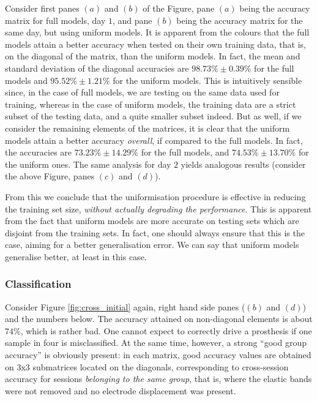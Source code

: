 Consider first panes $(a)$ and $(b)$ of the Figure, pane $(a)$ being
the accuracy matrix for full models, day $1$, and pane $(b)$ being the
accuracy matrix for the same day, but using uniform models. It is
apparent from the colours that the full models attain a better
accuracy when tested on their own training data, that is, on the
diagonal of the matrix, than the uniform models. In fact, the mean and
standard deviation of the diagonal accuracies are $98.73\% \pm 0.39\%$
for the full models and $95.52\% \pm 1.21\%$ for the uniform
models. This is intuitively sensible since, in the case of full
models, we are testing on the same data used for training, whereas in
the case of uniform models, the training data are a strict subset of
the testing data, and a quite smaller subset indeed. But as well, if
we consider the remaining elements of the matrices, it is clear that
the uniform models attain a better accuracy \emph{overall}, if
compared to the full models. In fact, the accuracies are $73.23\% \pm
14.29\%$ for the full models, and $74.53\% \pm 13.70\%$ for the
uniform ones. The same analysis for day $2$ yields analogous results
(consider the above Figure, panes $(c)$ and $(d)$).

From this we conclude that the uniformisation procedure is effective
in reducing the training set size, \emph{without actually degrading
the performance}. This is apparent from the fact that uniform models
are more accurate on testing sets which are disjoint from the training
sets. In fact, one should always ensure that this is the case, aiming
for a better generalisation error. We can say that uniform models
generalise better, at least in this case.

\subsubsection{Classification}

Consider Figure \ref{fig:cross_initial} again, right hand side panes
($(b)$ and $(d)$) and the numbers below. The accuracy attained on
non-diagonal elements is about $74\%$, which is rather bad. One cannot
expect to correctly drive a prosthesis if one sample in four is
misclassified. At the same time, however, a strong ``good group
accuracy'' is obviously present: in each matrix, good accuracy values
are obtained on 3x3 submatrices located on the diagonals,
corresponding to cross-session accuracy for sessions \emph{belonging
to the same group}, that is, where the elastic bands were not removed
and no electrode displacement was present.

